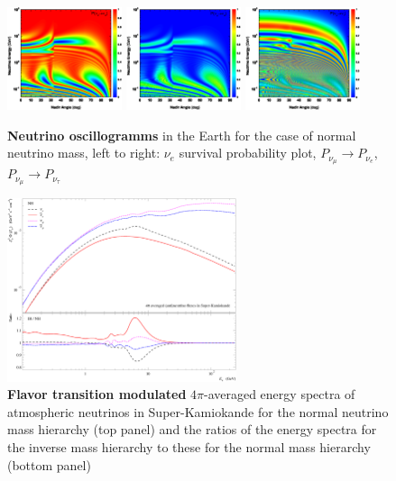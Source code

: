 \begin{figure}[htb!]
\begin{center}
\includegraphics[width=0.3\textwidth]{./MSW/Pee-NH2.eps}
\includegraphics[width=0.3\textwidth]{./MSW/Pme-NH2.eps}
\includegraphics[width=0.3\textwidth]{./MSW/Pmt-NH2.eps}
\caption{\label{ogramms}\textbf{Neutrino oscillogramms} in the Earth for the case of normal neutrino mass, left to right: $\nu_{e}$ survival probability plot, $P_{\nu_{\mu}}\to{}P_{\nu_{e}}$, $P_{\nu_{\mu}}\to{}P_{\nu_{\tau}}$}
\end{center}
\end{figure}

\begin{figure}[htb!]
\begin{center}
\includegraphics[width=0.6\textwidth]{./MSW/dF_dE_Honda11.eps}
\caption{\label{modspectra}\textbf{Flavor transition modulated} $4\pi$-averaged energy spectra of atmospheric neutrinos in Super-Kamiokande for the normal neutrino mass hierarchy (top panel) and the ratios of the energy spectra for the inverse mass hierarchy to these for the normal mass hierarchy (bottom panel)}
\end{center}
\end{figure}
